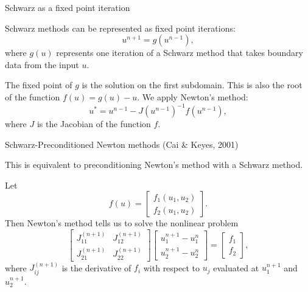 \documentclass{beamer}
\begin{document}
\iffalse
\begin{frame}{Schwarz as a fixed point iteration}

Schwarz methods can be represented as fixed point iterations:
\begin{equation*}
	u^{n+1} = g \left ( u^{n-1} \right ),
\end{equation*}
where $g(u)$ represents one iteration of a Schwarz method that takes boundary data from the input $u$.

The fixed point of $g$ is the solution on the first subdomain.
This is also the root of the function $f(u) = g(u) - u$.
We apply Newton's method:
\begin{equation*}
	u^* = u^{n-1} - J(u^{n-1})^{-1} f(u^{n-1}),
\end{equation*}
where $J$ is the Jacobian of the function $f$.
\end{frame}

\begin{frame}{Schwarz-Preconditioned Newton methods (Cai \& Keyes, 2001)}

This is equivalent to preconditioning Newton's method with a Schwarz method.

Let
\begin{equation*}
	f(u) = \begin{bmatrix} f_1(u_1, u_2) \\ f_2(u_1,u_2) \end{bmatrix}.
\end{equation*}
Then Newton's method tells us to solve the nonlinear problem
\begin{equation*}
	\begin{bmatrix} J_{11}^{(n+1)} & J_{12}^{(n+1)} \\ J_{21}^{(n+1)} & J_{22}^{(n+1)} \end{bmatrix} \begin{bmatrix} u_1^{n+1} - u_1^n \\ u_2^{n+1} - u_2^n \end{bmatrix} = \begin{bmatrix} f_1 \\ f_2 \end{bmatrix},
\end{equation*}
where $J_{ij}^{(n+1)}$ is the derivative of $f_i$ with respect to $u_j$ evaluated at $u_1^{n+1}$ and $u_2^{n+1}$.
\end{frame}
\end{document}
